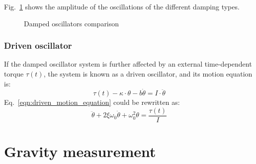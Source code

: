 \documentclass[\main/master.tex]{subfiles}
\begin{document}
\iffalse
\begin{equation}
\theta(t) = Ae^{-\frac{t}{\tau}(1+\sqrt{1-\frac{1}{\xi^2}})} + Be^{-\frac{t}{\tau}(1-\sqrt{1-\frac{1}{\xi^2}})}    \label{eqn:overdamped_motion_equation}
\end{equation}
\fi 
\par\noindent
Fig.~\ref{fig:damped_oscillators} shows the amplitude of the oscillations of the different damping types.
\begin{figure}[htbp]
	\centering
	\caption[Damped oscillators comparison]{Damped oscillators comparison}
	\label{fig:damped_oscillators}
\end{figure}
\FloatBarrier
\iffalse
https://ocw.mit.edu/courses/mathematics/18-03sc-differential-equations-fall-2011/unit-ii-second-order-constant-coefficient-linear-equations/damped-harmonic-oscillators/MIT18_03SCF11_s13_2text.pdf

https://www.sciencedirect.com/topics/engineering/underdamped-system#:~:text=When%
\fi
\subsubsection{Driven oscillator}
If the damped oscillator system is further affected by an external time-dependent torque $\tau(t)$, the system is known as a driven oscillator, and its motion equation is:
\begin{equation}
\tau(t) -\kappa\cdot\theta - b\dot{\theta}  = I\cdot\ddot{\theta}   \label{eqn:driven_motion_equation}
\end{equation} 
Eq.~\ref{eqn:driven_motion_equation} could be rewritten as:
\begin{equation}
\ddot{\theta} + 2\xi\omega_0\dot{\theta} + \omega_0^2\theta = \frac{\tau(t)}{I}   \label{eqn:driven_motion_equation_2}
\end{equation}






\section{Gravity measurement}
\end{document}
